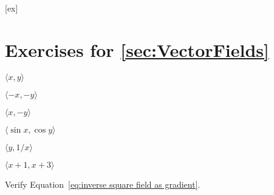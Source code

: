 [ex]
\section*{Exercises for \ref{sec:VectorFields}}

\begin{enumialphparenastyle}

\begin{ex} $\langle x,y\rangle$ 
\end{ex}

\begin{ex} $\langle -x, -y\rangle$ 
\end{ex}

\begin{ex} $\langle x,-y\rangle$ 
\end{ex}

\begin{ex} $\langle \sin x,\cos y\rangle$ 
\end{ex}

\begin{ex} $\langle y,1/x\rangle$ 
\end{ex}

\begin{ex} $\langle x+1,x+3\rangle$ 
\end{ex}

\begin{ex} Verify Equation~\ref{eq:inverse square field as gradient}.
\end{ex}

\end{enumialphparenastyle}